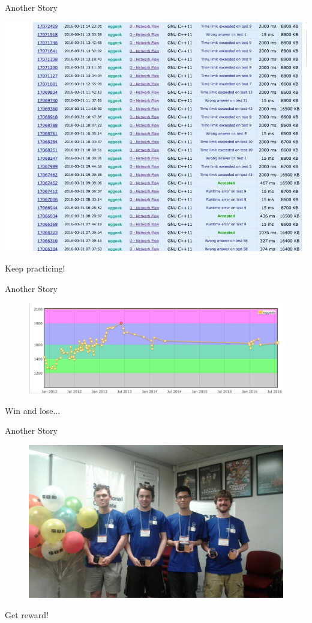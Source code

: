 \begin{frame}{Another Story}
\begin{minipage}{.75\textwidth}
  \begin{adjustbox}{max totalsize={1.\textwidth}{1.\textheight}, left}
  \centering
  \includegraphics[width=\textwidth]{pic/sub1.jpg}
  \end{adjustbox}
\end{minipage}%
\begin{minipage}{.25\textwidth}
  Keep practicing!
\end{minipage}
\end{frame}

\begin{frame}{Another Story}
  \begin{figure}
  \centering
  \includegraphics[width=\textwidth]{pic/rating.png}
  \end{figure}
  Win and lose...
\end{frame}

\begin{frame}{Another Story}
  \begin{figure}
  \centering
  \includegraphics[width=.7\textwidth]{pic/wf2016.jpg}
  \end{figure}
  Get reward!
\end{frame}

